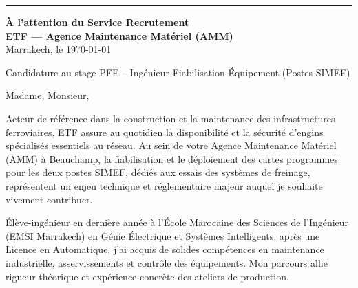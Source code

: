 \documentclass[10pt,a4paper]{altacv}
\makeatletter
\renewcommand{\makecvheader}{%
  \begingroup
    \raggedright\color{emphasis}%
    {\LARGE\bfseries\MakeUppercase{\@name}\par}\vspace{2pt}
    {\normalsize\bfseries\color{accent}\@tagline\par}\vspace{3.5pt}
    {\footnotesize\color{emphasis}\@personalinfo\par}
  \endgroup\vspace{4pt}
  {\color{heading}\rule{\linewidth}{1.2pt}}\par\vspace{8pt}
}
\makeatother
\begin{document}

\makecvheader

\begin{flushright}
  {\color{emphasis}\textbf{À l'attention du Service Recrutement}} \\[2pt]
  \textbf{ETF — Agence Maintenance Matériel (AMM)} \\[8pt]
  Marrakech, le \today
\end{flushright}
\vspace{4pt}

 Candidature au stage PFE -- Ingénieur Fiabilisation Équipement (Postes SIMEF)

\vspace{6pt}

\noindent Madame, Monsieur,

Acteur de référence dans la construction et la maintenance des infrastructures ferroviaires, ETF assure au quotidien la disponibilité et la sécurité d’engins spécialisés essentiels au réseau. Au sein de votre Agence Maintenance Matériel (AMM) à Beauchamp, la fiabilisation et le déploiement des cartes programmes pour les deux postes SIMEF, dédiés aux essais des systèmes de freinage, représentent un enjeu technique et réglementaire majeur auquel je souhaite vivement contribuer.

Élève-ingénieur en dernière année à l'École Marocaine des Sciences de l'Ingénieur (EMSI Marrakech) en Génie Électrique et Systèmes Intelligents, après une Licence en Automatique, j'ai acquis de solides compétences en maintenance industrielle, asservissements et contrôle des équipements. Mon parcours allie rigueur théorique et expérience concrète des ateliers de production.
\end{document}
